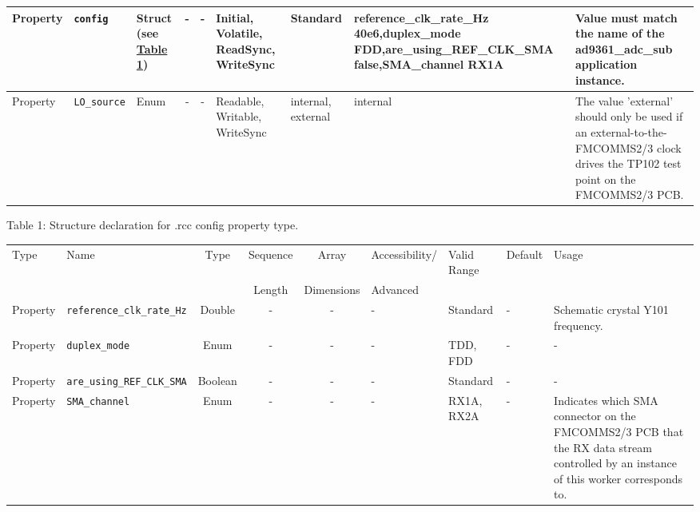 \begin{landscape}
\begin{scriptsize}
\begin{longtable}{|p{1.8cm}|p{4.1cm}|p{1cm}|c|c|p{1.6cm}|p{3.7cm}|p{3.7cm}|p{2.5cm}|}
			\hline
			Property & \verb+config+ & Struct (see \hyperlink{tab1}{Table 1}) & -        & -        & Initial, Volatile, ReadSync, WriteSync & Standard & reference\_clk\_rate\_Hz 40e6,duplex\_mode FDD,are\_using\_REF\_CLK\_SMA false,SMA\_channel RX1A & Value must match the name of the ad9361\_adc\_sub application instance. \\
			\hline
			Property & \verb+LO_source+ &Enum& -        & -        & Readable, Writable, WriteSync & internal, external  & internal & The value 'external' should only be used if an external-to-the-FMCOMMS2/3 clock drives the TP102 test point on the FMCOMMS2/3 PCB. \\
			\hline
		\end{longtable}
	\end{scriptsize}

	Table \hypertarget{tab1}{1}: Structure declaration for \comp{}.rcc config property type.
	\begin{scriptsize}
		\begin{longtable}{|p{1.8cm}|p{3.6cm}|c|c|c|p{2cm}|p{3.7cm}|p{3.7cm}|p{2.5cm}|}
			\hline
			\rowcolor{blue}
			Type         & Name                                & Type & Sequence & Array      & Accessibility/ & Valid Range  & Default & Usage                                                                                                                                                                                                                       \\
			\rowcolor{blue}
			             &                                     &      & Length   & Dimensions & Advanced       &              &         &                                                                                                                                                                                                                             \\
			\hline
			Property     & \verb+reference_clk_rate_Hz+                   & Double & -        & -          & - & Standard & - & Schematic crystal Y101 frequency. \\
			\hline
			Property     & \verb+duplex_mode+                             & Enum   & -        & -          & - & TDD, FDD & - & - \\
			\hline
			Property     & \verb+are_using_REF_CLK_SMA+                             & Boolean& -        & -          & - & Standard & - & - \\
			\hline
			Property     & \verb+SMA_channel+                                       & Enum   & -        & -          & - & RX1A, RX2A & - & Indicates which SMA connector on the FMCOMMS2/3 PCB that the RX data stream controlled by an instance of this worker corresponds to. \\
			\hline
		\end{longtable}
	\end{scriptsize}

\end{landscape}

